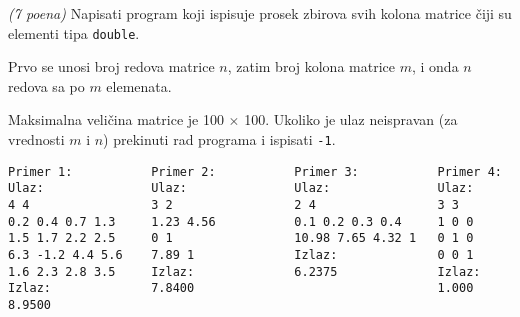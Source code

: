 \begin{Exercise}[label=v1.3_01] 
{\em (7 poena)} Napisati program koji ispisuje prosek zbirova svih kolona
matrice čiji su elementi tipa \verb|double|.

Prvo se unosi broj redova matrice $n$, zatim broj kolona matrice
$m$, i onda $n$ redova sa po $m$ elemenata.

Maksimalna veli\v cina matrice je 100 $\times$ 100. Ukoliko je ulaz neispravan (za vrednosti $m$ i $n$) 
prekinuti rad programa i ispisati {\tt -1}.


\begin{center}
\begin{verbatim}
Primer 1:           Primer 2:           Primer 3:           Primer 4:
Ulaz:               Ulaz:               Ulaz:               Ulaz:
4 4                 3 2                 2 4                 3 3
0.2 0.4 0.7 1.3     1.23 4.56           0.1 0.2 0.3 0.4     1 0 0
1.5 1.7 2.2 2.5     0 1                 10.98 7.65 4.32 1   0 1 0
6.3 -1.2 4.4 5.6    7.89 1              Izlaz:              0 0 1
1.6 2.3 2.8 3.5     Izlaz:              6.2375              Izlaz:
Izlaz:              7.8400                                  1.000
8.9500                

\end{verbatim}
\end{center}
\end{Exercise}
\begin{Answer}[ref=v1.3_01]
\end{Answer}

